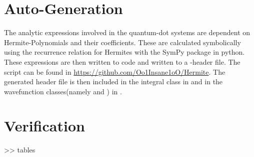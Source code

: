 \section{Auto-Generation\label{sec:auto_generation}}
    The analytic expressions involved in the quantum-dot systems are dependent
    on Hermite-Polynomials and their coefficients. These are calculated
    symbolically using the recurrence relation for Hermites with the SymPy
    package in python. These expressions are then written to \CC code and
    written to a \CC-header file. The script can be found in
    \url{https://github.com/Oo1Insane1oO/Hermite}. The generated header file is
    then included in the integral class in  and in
    the wavefunction classes(namely  and
    ) in .

\section{Verification\label{sec:verification}}

    >> tables
